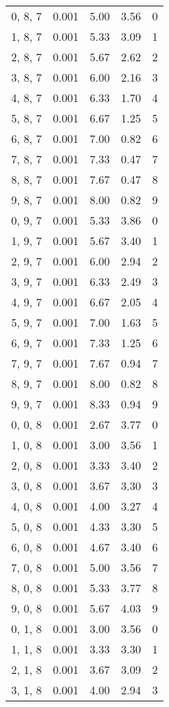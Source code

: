 \documentclass[12pt]{article}
\begin{document}
\begin{tabular}{c || c || c | c | c}
0, 8, 7 & 0.001 & 5.00 & 3.56 & 0 \\
1, 8, 7 & 0.001 & 5.33 & 3.09 & 1 \\
2, 8, 7 & 0.001 & 5.67 & 2.62 & 2 \\
3, 8, 7 & 0.001 & 6.00 & 2.16 & 3 \\
4, 8, 7 & 0.001 & 6.33 & 1.70 & 4 \\
5, 8, 7 & 0.001 & 6.67 & 1.25 & 5 \\
6, 8, 7 & 0.001 & 7.00 & 0.82 & 6 \\
7, 8, 7 & 0.001 & 7.33 & 0.47 & 7 \\
8, 8, 7 & 0.001 & 7.67 & 0.47 & 8 \\
9, 8, 7 & 0.001 & 8.00 & 0.82 & 9 \\
0, 9, 7 & 0.001 & 5.33 & 3.86 & 0 \\
1, 9, 7 & 0.001 & 5.67 & 3.40 & 1 \\
2, 9, 7 & 0.001 & 6.00 & 2.94 & 2 \\
3, 9, 7 & 0.001 & 6.33 & 2.49 & 3 \\
4, 9, 7 & 0.001 & 6.67 & 2.05 & 4 \\
5, 9, 7 & 0.001 & 7.00 & 1.63 & 5 \\
6, 9, 7 & 0.001 & 7.33 & 1.25 & 6 \\
7, 9, 7 & 0.001 & 7.67 & 0.94 & 7 \\
8, 9, 7 & 0.001 & 8.00 & 0.82 & 8 \\
9, 9, 7 & 0.001 & 8.33 & 0.94 & 9 \\
0, 0, 8 & 0.001 & 2.67 & 3.77 & 0 \\
1, 0, 8 & 0.001 & 3.00 & 3.56 & 1 \\
2, 0, 8 & 0.001 & 3.33 & 3.40 & 2 \\
3, 0, 8 & 0.001 & 3.67 & 3.30 & 3 \\
4, 0, 8 & 0.001 & 4.00 & 3.27 & 4 \\
5, 0, 8 & 0.001 & 4.33 & 3.30 & 5 \\
6, 0, 8 & 0.001 & 4.67 & 3.40 & 6 \\
7, 0, 8 & 0.001 & 5.00 & 3.56 & 7 \\
8, 0, 8 & 0.001 & 5.33 & 3.77 & 8 \\
9, 0, 8 & 0.001 & 5.67 & 4.03 & 9 \\
0, 1, 8 & 0.001 & 3.00 & 3.56 & 0 \\
1, 1, 8 & 0.001 & 3.33 & 3.30 & 1 \\
2, 1, 8 & 0.001 & 3.67 & 3.09 & 2 \\
3, 1, 8 & 0.001 & 4.00 & 2.94 & 3 \\

\end{tabular}
\end{document}
